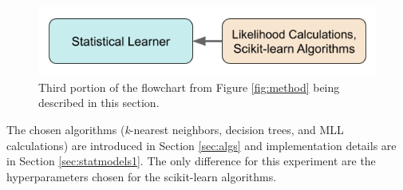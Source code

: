 
\begin{figure}[H]
  \centering
  \includegraphics[width=0.7\linewidth]{./chapters/exp1/methodology3.png}
  \caption{Third portion of the flowchart from Figure \ref{fig:method} being 
           described in this section.}
\end{figure}

The chosen algorithms (\textit{k}-nearest neighbors, decision trees, and
\gls{MLL} calculations) are introduced in Section \ref{sec:algs} and
implementation details are in Section \ref{sec:statmodels1}. The only
difference for this experiment are the hyperparameters chosen for the
scikit-learn algorithms.


